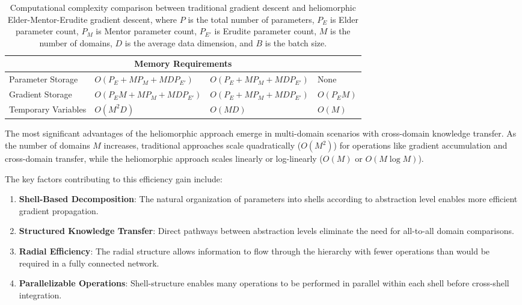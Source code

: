 \begin{table}[h]
\begin{tabular}{|p{3cm}|p{4.5cm}|p{4.5cm}|p{3cm}|}
\hline
\multicolumn{4}{|c|}{\textbf{Memory Requirements}} \\
\hline
Parameter Storage & $O(P_E + MP_M + MD P_{E'})$ & $O(P_E + MP_M + MD P_{E'})$ & None \\
\hline
Gradient Storage & $O(P_E M + MP_M + MD P_{E'})$ & $O(P_E + MP_M + MD P_{E'})$ & $O(P_E M)$ \\
\hline
Temporary Variables & $O(M^2D)$ & $O(MD)$ & $O(M)$ \\
\hline
\end{tabular}
\caption{Computational complexity comparison between traditional gradient descent and heliomorphic Elder-Mentor-Erudite gradient descent, where $P$ is the total number of parameters, $P_E$ is Elder parameter count, $P_M$ is Mentor parameter count, $P_{E'}$ is Erudite parameter count, $M$ is the number of domains, $D$ is the average data dimension, and $B$ is the batch size.}
\label{tab:complexity_comparison}
\end{table}

The most significant advantages of the heliomorphic approach emerge in multi-domain scenarios with cross-domain knowledge transfer. As the number of domains $M$ increases, traditional approaches scale quadratically ($O(M^2)$) for operations like gradient accumulation and cross-domain transfer, while the heliomorphic approach scales linearly or log-linearly ($O(M)$ or $O(M \log M)$).

The key factors contributing to this efficiency gain include:

\begin{enumerate}
    \item \textbf{Shell-Based Decomposition}: The natural organization of parameters into shells according to abstraction level enables more efficient gradient propagation.
    
    \item \textbf{Structured Knowledge Transfer}: Direct pathways between abstraction levels eliminate the need for all-to-all domain comparisons.
    
    \item \textbf{Radial Efficiency}: The radial structure allows information to flow through the hierarchy with fewer operations than would be required in a fully connected network.
    
    \item \textbf{Parallelizable Operations}: Shell-structure enables many operations to be performed in parallel within each shell before cross-shell integration.
\end{enumerate}

